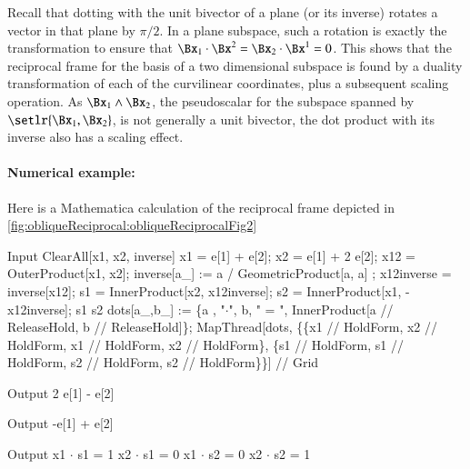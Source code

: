 
Recall that dotting with the unit bivector of a plane (or its inverse) rotates a vector in that plane by \( \pi/2 \).
In a plane subspace, such a rotation is exactly the transformation to ensure that \( \Bx_1 \cdot \Bx^2 = \Bx_2 \cdot \Bx^1 = 0 \).
This shows that the reciprocal frame for the basis of a two dimensional subspace is found by a duality transformation of each of the curvilinear coordinates, plus a subsequent scaling operation.
As \( \Bx_1 \wedge \Bx_2 \), the pseudoscalar for the subspace spanned by \( \setlr{ \Bx_1, \Bx_2 } \), is not generally a unit bivector, the dot product with its inverse also has a scaling effect.

\paragraph{Numerical example:}
Here is a Mathematica calculation of the reciprocal frame depicted in \cref{fig:obliqueReciprocal:obliqueReciprocalFig2}

\begin{mmaCell}[moredefined={x1, x2, inverse, e, x12, OuterProduct, GeometricProduct, x12inverse, s1, InnerProduct, s2, dots},morepattern={a_, a, b_, b}]{Input}
  ClearAll[x1, x2, inverse]
  x1 = e[1] + e[2]; x2 = e[1] + 2 e[2];
  x12 = OuterProduct[x1, x2];
  inverse[a_] := a / GeometricProduct[a, a] ;
  x12inverse = inverse[x12];
  s1 = InnerProduct[x2, x12inverse];
  s2 = InnerProduct[x1, -x12inverse];
  s1
  s2
  dots[a_,b_] := \{a , "\(\pmb{\cdot}\)", b, " = ",
                   InnerProduct[a // ReleaseHold, b // ReleaseHold]\};
  MapThread[dots, \{\{x1 // HoldForm, x2 // HoldForm,
                      x1 // HoldForm, x2 // HoldForm\},
                  \{s1 // HoldForm, s1 // HoldForm,
                    s2 // HoldForm, s2 // HoldForm\}\}] // Grid
\end{mmaCell}
\begin{mmaCell}{Output}
  2 e[1] - e[2]
\end{mmaCell}
\begin{mmaCell}{Output}
  -e[1] + e[2]
\end{mmaCell}
\begin{mmaCell}{Output}
  x1	\(\cdot\)	s1	 = 	1
  x2	\(\cdot\)	s1	 = 	0
  x1	\(\cdot\)	s2	 = 	0
  x2	\(\cdot\)	s2	 = 	1
\end{mmaCell}

